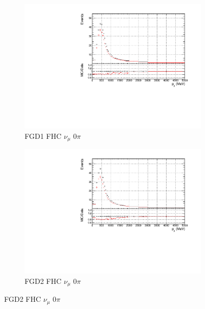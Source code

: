 \begin{figure}[!h]
\begin{subfigure}{0.49\textwidth}
  \centering
  \includegraphics[width=\textwidth]{figs/prioronly1D_p_FGD1_numuCC_0pi}
  \caption{FGD1 FHC $\nu_{\mu}$ 0$\pi$}
\end{subfigure}
\begin{subfigure}{0.49\textwidth}
  \centering
  \includegraphics[width=\textwidth]{figs/prioronly1D_p_FGD2_numuCC_0pi}
  \caption{FGD2 FHC $\nu_{\mu}$ 0$\pi$}
\end{subfigure}


\end{figure}

